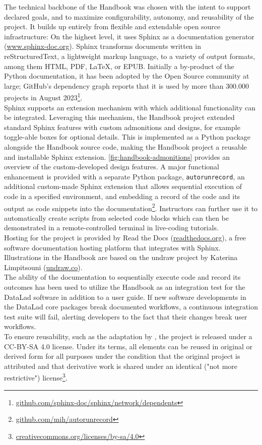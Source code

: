 The technical backbone of the Handbook was chosen with the intent to support declared goals, and to maximize configurability, autonomy, and reusability of the project.
It builds up entirely from flexible and extendable open source infrastructure:
On the highest level, it uses Sphinx as a documentation generator (\href{https://www.sphinx-doc.org/en/master/}{www.sphinx-doc.org}).
Sphinx transforms documents written in reStructuredText, a lightweight markup language, to a variety of output formats, among them HTML, PDF, \LaTeX, or EPUB.
Initially a by-product of the Python documentation, it has been adopted by the Open Source community at large;
GitHub's dependency graph reports that it is used by more than 300.000 projects in August 2023\footnote{\href{https://github.com/sphinx-doc/sphinx/network/dependents}{github.com/sphinx-doc/sphinx/network/dependents}}. \\
Sphinx supports an extension mechanism with which additional functionality can be integrated.
Leveraging this mechanism, the Handbook project extended standard Sphinx features with custom admonitions and designs, for example toggle-able boxes for optional details.
This is implemented as a Python package alongside the Handbook source code, making the Handbook project a reusable and installable Sphinx extension.
\cref{fig:handbook-admonitions} provides an overview of the custom-developed design features.
A major functional enhancement is provided with a separate Python package, \texttt{autorunrecord}, an additional custom-made Sphinx extension that allows sequential execution of code in a specified environment, and embedding a record of the code and its output as code snippets into the documentation\footnote{\href{https://github.com/mih/autorunrecord}{github.com/mih/autorunrecord}}.
Instructors can further use it to automatically create scripts from selected code blocks which can then be demonstrated in a remote-controlled terminal in live-coding tutorials.\\
Hosting for the project is provided by Read the Docs (\href{https://readthedocs.org/}{readthedocs.org}), a free software documentation hosting platform that integrates with Sphinx.
Illustrations in the Handbook are based on the undraw project by Katerina Limpitsouni (\href{https://undraw.co/}{undraw.co}). \\
The ability of the documentation to sequentially execute code and record its outcomes has been used to utilize the Handbook as an integration test for the DataLad software in addition to a user guide.
If new software developments in the DataLad core packages break documented workflows, a continuous integration test suite will fail, alerting developers to the fact that their changes break user workflows. \\
To ensure reusability, such as the adaptation by \citet{brooks2021handbook}, the project is released under a CC-BY-SA 4.0 license.
Under its terms, all elements can be reused in original or derived form for all purposes under the condition that the original project is attributed and that derivative work is shared under an identical ("not more restrictive") license\footnote{\href{https://creativecommons.org/licenses/by-sa/4.0/}{creativecommons.org/licenses/by-sa/4.0}}.

